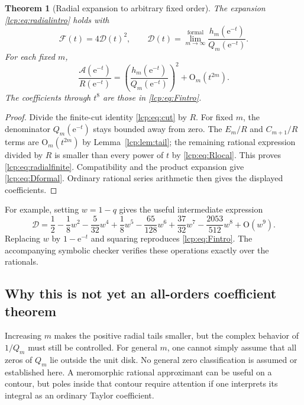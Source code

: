 \documentclass[11pt]{article}
\numberwithin{equation}{section}
\newtheorem{theorem}{Theorem}[section]
\theoremstyle{definition}\newtheorem{definition}[theorem]{Definition}
\theoremstyle{remark}\newtheorem{remark}[theorem]{Remark}
\newcommand{\OO}{\mathrm O}
\newcommand{\Acal}{\mathcal A}
\newcommand{\ee}{\mathrm e}
\begin{document}
\begin{theorem}[Radial expansion to arbitrary fixed order]\label{lcp:thm:radial}
The expansion \eqref{lcp:eq:radialintro} holds with
\begin{equation}\label{lcp:eq:Dformal}
 \mathcal F(t)=4\mathcal D(t)^2,\qquad
 \mathcal D(t)=\lim_{m\to\infty}^{\text{formal}}
         \frac{h_m(\ee^{-t})}{Q_m(\ee^{-t})}.
\end{equation}
For each fixed $m$,
\begin{equation}\label{lcp:eq:radialfinite}
 \frac{\Acal(\ee^{-t})}{R(\ee^{-t})}
   =\left(\frac{h_m(\ee^{-t})}{Q_m(\ee^{-t})}\right)^2
          +\OO_m(t^{2m}).
\end{equation}
The coefficients through $t^8$ are those in \eqref{lcp:eq:Fintro}.
\end{theorem}
\begin{proof}
Divide the finite-cut identity \eqref{lcp:eq:cut} by $R$.
For fixed $m$, the denominator $Q_m(\ee^{-t})$ stays bounded away from
zero. The $E_m/R$ and $C_{m+1}/R$ terms are $\OO_m(t^{2m})$ by
Lemma~\ref{lcp:lem:tail}; the remaining rational expression divided by $R$
is smaller than every power of $t$ by \eqref{lcp:eq:Rlocal}.
This proves \eqref{lcp:eq:radialfinite}. Compatibility and the product
expansion give \eqref{lcp:eq:Dformal}. Ordinary rational series arithmetic
then gives the displayed coefficients.
\end{proof}

For example, setting $w=1-q$ gives the useful intermediate expression
\[
 \mathcal D=
 \frac12-\frac18w^2-\frac5{32}w^4+\frac18w^5
 -\frac{65}{128}w^6+\frac{37}{32}w^7
 -\frac{2053}{512}w^8+\OO(w^9).
\]
Replacing $w$ by $1-\ee^{-t}$ and squaring reproduces
\eqref{lcp:eq:Fintro}. The accompanying symbolic checker verifies these
operations exactly over the rationals.

\subsection{Why this is not yet an all-orders coefficient theorem}
Increasing $m$ makes the positive radial tails smaller, but the complex
behavior of $1/Q_m$ must still be controlled. For general $m$, one cannot
simply assume that all zeros of $Q_m$ lie outside the unit disk.
No general zero classification is assumed or established here.
A meromorphic rational approximant can be useful on a contour, but poles
inside that contour require attention if one interprets its integral as
an ordinary Taylor coefficient.
\end{document}
